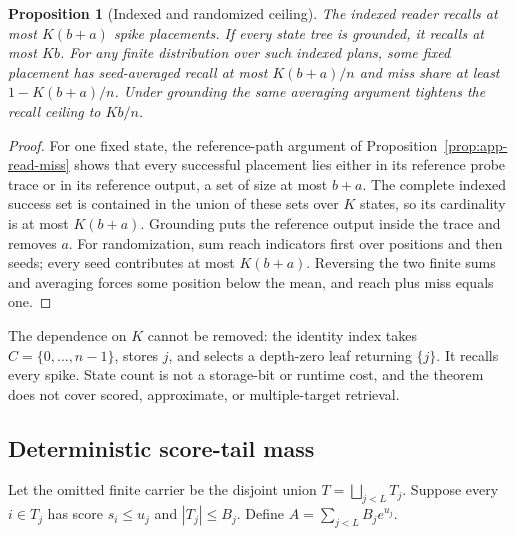\documentclass[11pt]{article}
\numberwithin{equation}{section}
\newtheorem{proposition}{Proposition}
\begin{document}
\begin{proposition}[Indexed and randomized ceiling]\label{prop:app-index-capacity}
The indexed reader recalls at most $K(b+a)$ spike placements. If every state tree is grounded, it recalls at
most $Kb$. For any finite distribution over such indexed plans, some fixed placement has seed-averaged recall
at most $K(b+a)/n$ and miss share at least $1-K(b+a)/n$. Under grounding the same averaging argument
tightens the recall ceiling to $Kb/n$.
\end{proposition}
\begin{proof}
For one fixed state, the reference-path argument of Proposition~\ref{prop:app-read-miss} shows that every
successful placement lies either in its reference probe trace or in its reference output, a set of size at
most $b+a$. The complete indexed success set is contained in the union of these sets over $K$ states, so its
cardinality is at most $K(b+a)$. Grounding puts the reference output inside the trace and removes $a$. For
randomization, sum reach indicators first over positions and then seeds; every seed contributes at most
$K(b+a)$. Reversing the two finite sums and averaging forces some position below the mean, and reach plus
miss equals one.
\end{proof}

The dependence on $K$ cannot be removed: the identity index takes $C=\{0,\ldots,n-1\}$, stores $j$, and
selects a depth-zero leaf returning $\{j\}$. It recalls every spike. State count is not a storage-bit or
runtime cost, and the theorem does not cover scored, approximate, or multiple-target retrieval.

\subsection{Deterministic score-tail mass}
Let the omitted finite carrier be the disjoint union $T=\bigsqcup_{j<L}T_j$. Suppose every $i\in T_j$ has
score $s_i\le u_j$ and $|T_j|\le B_j$. Define $A=\sum_{j<L}B_je^{u_j}$.
\end{document}

